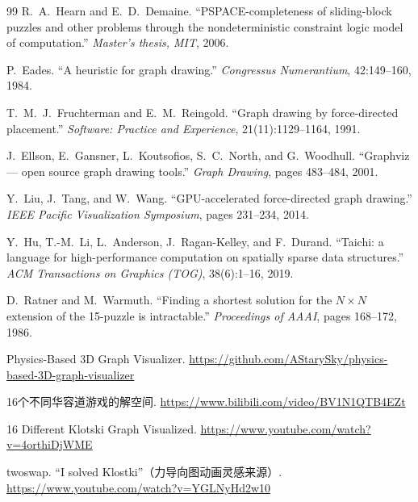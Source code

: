 \documentclass[11pt,a4paper]{report}
\begin{document}
\begin{thebibliography}{99}
R.~A.~Hearn and E.~D.~Demaine.
\newblock ``PSPACE-completeness of sliding-block puzzles and other problems
through the nondeterministic constraint logic model of computation.''
\newblock \textit{Master's thesis, MIT}, 2006.

P.~Eades.
\newblock ``A heuristic for graph drawing.''
\newblock \textit{Congressus Numerantium}, 42:149--160, 1984.

T.~M.~J.~Fruchterman and E.~M.~Reingold.
\newblock ``Graph drawing by force-directed placement.''
\newblock \textit{Software: Practice and Experience}, 21(11):1129--1164, 1991.

J.~Ellson, E.~Gansner, L.~Koutsofios, S.~C.~North, and G.~Woodhull.
\newblock ``Graphviz --- open source graph drawing tools.''
\newblock \textit{Graph Drawing}, pages 483--484, 2001.

Y.~Liu, J.~Tang, and W.~Wang.
\newblock ``GPU-accelerated force-directed graph drawing.''
\newblock \textit{IEEE Pacific Visualization Symposium}, pages 231--234, 2014.

Y.~Hu, T.-M.~Li, L.~Anderson, J.~Ragan-Kelley, and F.~Durand.
\newblock ``Taichi: a language for high-performance computation on
spatially sparse data structures.''
\newblock \textit{ACM Transactions on Graphics (TOG)}, 38(6):1--16, 2019.

D.~Ratner and M.~Warmuth.
\newblock ``Finding a shortest solution for the $N \times N$ extension of the
15-puzzle is intractable.''
\newblock \textit{Proceedings of AAAI}, pages 168--172, 1986.

Physics-Based 3D Graph Visualizer.
\newblock \url{https://github.com/AStarySky/physics-based-3D-graph-visualizer}

16个不同华容道游戏的解空间.
\newblock \url{https://www.bilibili.com/video/BV1N1QTB4EZt}

16 Different Klotski Graph Visualized.
\newblock \url{https://www.youtube.com/watch?v=4orthiDjWME}

twoswap.
\newblock ``I solved Klostki''（力导向图动画灵感来源）.
\newblock \url{https://www.youtube.com/watch?v=YGLNyHd2w10}
\end{thebibliography}
\end{document}
